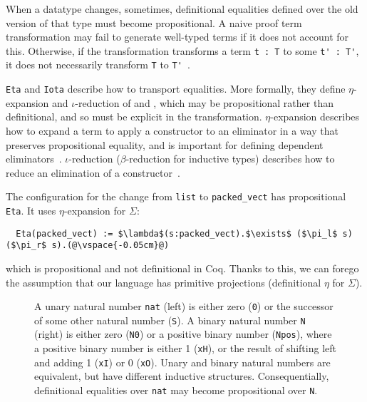 When a datatype changes, sometimes, definitional equalities defined over the old version of that type must become propositional.
A naive proof term transformation may fail to generate well-typed terms if it does not account for this.
Otherwise, if the transformation transforms a term \lstinline{t : T} to some \lstinline{t' : T'}, it does not necessarily
transform \lstinline{T} to \lstinline{T'}~\cite{tabareau2019marriage}.

\lstinline{Eta} and \lstinline{Iota} describe how to transport equalities.
More formally, they define $\eta$-expansion and $\iota$-reduction of \Aa and \B,
which may be propositional rather than definitional,
and so must be explicit in the transformation.
$\eta$-expansion describes how to expand a term to apply a constructor to an eliminator in a way that preserves propositional equality,
and is important for defining dependent eliminators~\cite{nlab:eta-conversion}.
$\iota$-reduction ($\beta$-reduction for inductive types) describes how to reduce an elimination of a constructor~\cite{nlab:beta-reduction}.

The configuration for the change from \lstinline{list} to \lstinline{packed_vect} has propositional \lstinline{Eta}.
It uses $\eta$-expansion for $\Sigma$:

\begin{lstlisting}
  Eta(packed_vect) := $\lambda$(s:packed_vect).$\exists$ ($\pi_l$ s) ($\pi_r$ s).(@\vspace{-0.05cm}@)
\end{lstlisting}
which is propositional and not definitional in Coq.
Thanks to this, we can forego the assumption that our language has primitive projections (definitional $\eta$ for $\Sigma$).

\begin{figure}
\begin{minipage}{0.44\columnwidth}
   
\end{minipage}
\hfill
\begin{minipage}{0.54\columnwidth}
   
\end{minipage}
\vspace{-0.2cm}
\caption{A unary natural number \lstinline{nat} (left) is either zero (\lstinline{0}) or the successor of some other natural number (\lstinline{S}).
A binary natural number \lstinline{N} (right) is either zero (\lstinline{N0}) or a positive binary number (\lstinline{Npos}), where a positive binary number is either 1 (\lstinline{xH}), or the result of shifting left and adding 1 (\lstinline{xI}) or
0 (\lstinline{xO}). Unary and binary natural numbers are equivalent, but have different inductive structures.
Consequentially, definitional equalities over \lstinline{nat} may become propositional over \lstinline{N}.}
\vspace{-0.2cm}
\label{fig:nattobin}
\end{figure}


